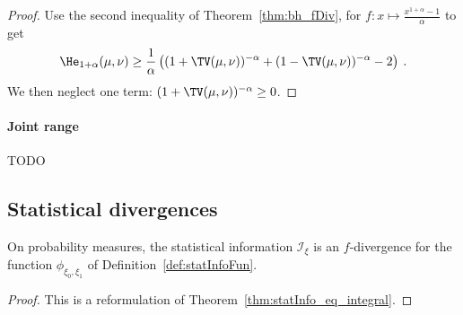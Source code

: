 \begin{proof}%
{}
Use the second inequality of Theorem~\ref{thm:bh_fDiv}, for $f: x \mapsto \frac{x^{1+\alpha} - 1}{\alpha}$ to get
\begin{align*}
\He_{1+\alpha}(\mu, \nu) \ge \frac{1}{\alpha} \left((1 + \TV(\mu, \nu))^{-\alpha} + (1 - \TV(\mu, \nu))^{-\alpha} - 2 \right) \: .
\end{align*}
We then neglect one term: $(1 + \TV(\mu, \nu))^{-\alpha} \ge 0$.
\end{proof}


\paragraph{Joint range}

TODO \cite{harremoes2011pairs}


\subsection{Statistical divergences}

\begin{lemma}
  \label{lem:statInfo_eq_fDiv}
  \leanok
  On probability measures, the statistical information $\mathcal I_\xi$ is an $f$-divergence for the function $\phi_{\xi_0, \xi_1}$ of Definition~\ref{def:statInfoFun}.
\end{lemma}

\begin{proof}\leanok
{}
This is a reformulation of Theorem~\ref{thm:statInfo_eq_integral}.
\end{proof}




